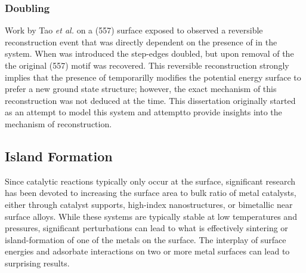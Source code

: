 \subsubsection{Doubling}
Work by Tao {\it et al.} on a  (557) surface exposed to  observed
a reversible reconstruction event that was directly dependent on the presence
of  in the system. When  was introduced the step-edges doubled,
but upon removal of the  the original (557) motif was recovered. This
reversible reconstruction strongly implies that the presence of 
temporarilly modifies the potential energy surface to prefer a new ground state
structure; however, the exact mechanism of this reconstruction was not deduced
at the time. This dissertation originally started as an attempt to model this
system and attemptto provide insights into the mechanism of reconstruction. 

\subsection{Island Formation}
Since catalytic reactions typically only occur at the surface, significant
research has been devoted to increasing the surface area to bulk ratio of metal
catalysts, either through catalyst supports, high-index nanostructures, or
bimetallic near surface alloys. While these systems are typically stable at low
temperatures and pressures, significant perturbations can lead to what is
effectively sintering or island-formation of one of the metals on the surface.
The interplay of surface energies and adsorbate interactions on two or more
metal surfaces can lead to surprising results.
